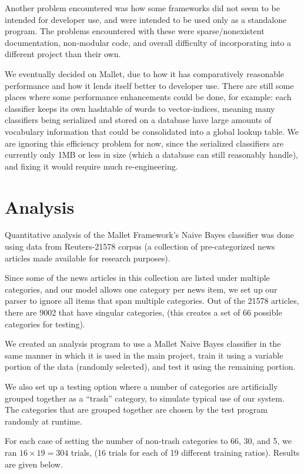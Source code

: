 \documentclass[letterpaper]{article}
\begin{document}
Another problem encountered was how some frameworks did not seem to be intended for developer use, and were intended to be used only as a standalone program. The problems encountered with these were sparse/nonexistent documentation, non-modular code, and overall difficulty of incorporating into a different project than their own.

We eventually decided on Mallet, due to how it has comparatively reasonable performance and how it lends itself better to developer use. There are still some places where some performance enhancements could be done, for example: each classifier keeps its own hashtable of words to vector-indices, meaning many classifiers being serialized and stored on a database have large amounts of vocabulary information that could be consolidated into a global lookup table. We are ignoring this efficiency problem for now, since the serialized classifiers are currently only 1MB or less in size (which a database can still reasonably handle), and fixing it would require much re-engineering.

\section{Analysis}
Quantitative analysis of the Mallet Framework's Naive Bayes classifier was done using data from Reuters-21578 corpus \cite{Reuters21578} (a collection of pre-categorized news articles made available for research purposes).

Since some of the news articles in this collection are listed under multiple categories, and our model allows one category per news item, we set up our parser to ignore all items that span multiple categories. Out of the 21578 articles, there are 9002 that have singular categories, (this creates a set of 66 possible categories for testing).

We created an analysis program to use a Mallet Naive Bayes classifier in the same manner in which it is used in the main project, train it using a variable portion of the data (randomly selected), and test it using the remaining portion.

We also set up a testing option where a number of categories are artificially grouped together as a ``trash'' category, to simulate typical use of our system. The categories that are grouped together are chosen by the test program randomly at runtime.

For each case of setting the number of non-trash categories to 66, 30, and 5, we ran $16\times 19=304$ trials, (16 trials for each of 19 different training ratios). Results are given below.
\end{document}
